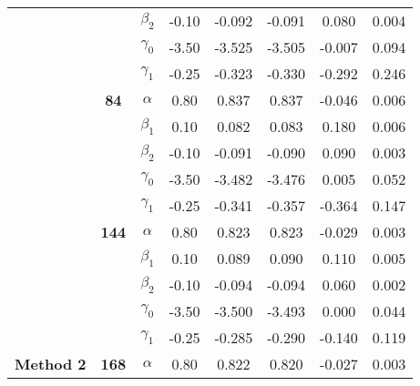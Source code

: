 \begin{table}[h]
\begin{tabular}[t]{>{}c>{}ccccccc}
 &  & $\beta_2$ & -0.10 & -0.092 & -0.091 & 0.080 & 0.004\\

 &  & $\gamma_0$ & -3.50 & -3.525 & -3.505 & -0.007 & 0.094\\

 &  & $\gamma_1$ & -0.25 & -0.323 & -0.330 & -0.292 & 0.246\\

 & \multirow{-5}{*}{\centering\arraybackslash \textbf{84}} & $\alpha$ & 0.80 & 0.837 & 0.837 & -0.046 & 0.006\\

 &  & $\beta_1$ & 0.10 & 0.082 & 0.083 & 0.180 & 0.006\\

 &  & $\beta_2$ & -0.10 & -0.091 & -0.090 & 0.090 & 0.003\\

 &  & $\gamma_0$ & -3.50 & -3.482 & -3.476 & 0.005 & 0.052\\

 &  & $\gamma_1$ & -0.25 & -0.341 & -0.357 & -0.364 & 0.147\\

 & \multirow{-5}{*}{\centering\arraybackslash \textbf{144}} & $\alpha$ & 0.80 & 0.823 & 0.823 & -0.029 & 0.003\\

 &  & $\beta_1$ & 0.10 & 0.089 & 0.090 & 0.110 & 0.005\\

 &  & $\beta_2$ & -0.10 & -0.094 & -0.094 & 0.060 & 0.002\\

 &  & $\gamma_0$ & -3.50 & -3.500 & -3.493 & 0.000 & 0.044\\

 &  & $\gamma_1$ & -0.25 & -0.285 & -0.290 & -0.140 & 0.119\\

\multirow{-15}{*}{\centering\arraybackslash \textbf{Method 2}} & \multirow{-5}{*}{\centering\arraybackslash \textbf{168}} & $\alpha$ & 0.80 & 0.822 & 0.820 & -0.027 & 0.003\\
\bottomrule
\end{tabular}
\end{table}

